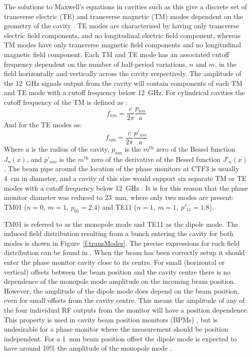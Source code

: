The solutions to Maxwell's equations in cavities such as this give a discrete set of transverse electric (TE) and transverse magnetic (TM) modes dependent on the geometry of the cavity \cite{collinsWvGd}. TE modes are characterised by having only transverse electric field components, and no longitudinal electric field component, whereas TM modes have only transverse magnetic field components and no longitudinal magnetic field component. Each TM and TE mode has an associated cutoff frequency dependent on the number of half-period variations, \(n\) and \(m\), in the field horizontally and vertically across the cavity respectively. The amplitude of the 12~GHz signals output from the cavity will contain components of each TM and TE mode with a cutoff frequency below 12~GHz. For cylindrical cavities the cutoff frequency of the TM is defined as \cite{collinsWvGd}:
\begin{equation}
f_{nm} = \frac{c}{2\pi}\frac{p_{nm}}{a} 
\end{equation}
And for the TE modes as:
\begin{equation}
f_{nm} = \frac{c}{2\pi}\frac{p'_{nm}}{a} 
\end{equation}
Where \(a\) is the radius of the cavity, \(p_{nm}\) is the \(m^\mathrm{th}\) zero of the Bessel function \(J_n(x)\), and \(p'_{nm}\) is the \(m^\mathrm{th}\) zero of the derivative of the Bessel function \(J'_n(x)\) \cite{kreyszig}. The beam pipe around the location of the phase monitors at CTF3 is usually 4~cm in diameter, and a cavity of this size would support six separate TM or TE modes with a cutoff frequency below 12~GHz \cite{phMonIPAC10}. It is for this reason that the phase monitor diameter was reduced to 23~mm, where only two modes are present: TM01 (\(n=0,~m=1,~p_{01}=2.4\)) and TE11 (\(n=1,~m=1,~p'_{11}=1.8\)).

TM01 is referred to as the monopole mode and TE11 as the dipole mode. The induced field distribution resulting from a bunch entering the cavity for both modes is shown in Figure~\ref{f:transModes}. The precise expressions for each field distribution can be found in \cite{lipka}. When the beam has been correctly setup it should enter the phase monitor cavity close to its centre. For small (horizontal or vertical) offsets between the beam position and the cavity centre there is no dependence of the monopole mode amplitude on the incoming beam position. However, the amplitude of the dipole mode does depend on the beam position, even for small offsets from the cavity centre. This means the amplitude of any of the four individual RF outputs from the monitor will have a position dependence. This property is used in cavity beam position monitors (BPMs) \cite{lipka}, but is undesirable for a phase monitor where the measurement should be position independent. For a 1~mm beam position offset the dipole mode is expected to have around 10\% the amplitude of the monopole mode \cite{alexCWS13}.

